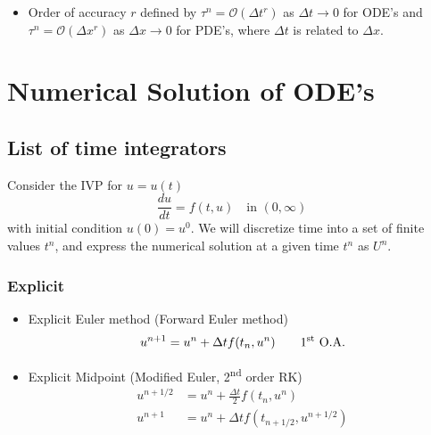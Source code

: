 \documentclass[oneside,a4paper,11pt]{report}
\begin{document}
\begin{itemize}
\item Order of accuracy $r$ defined by $\tau^n = \mathcal{O}(\Delta t^r)$ as $\Delta t \to 0$ for ODE's and $\tau^n = \mathcal{O}(\Delta x^r)$ as $\Delta x \to 0$ for PDE's, where $\Delta t$ is related to $\Delta x$.

\end{itemize}

\part{Numerical Solution of ODE's}

\chapter{List of time integrators}
Consider the IVP for $u=u(t)$
\begin{equation}
\label{ode}
\frac{du}{dt} = f(t, u) \quad \text{in } (0,\infty)
\end{equation}
with initial condition $u(0) = u^0$. We will discretize time into a set of finite values $t^n$, and express the numerical solution at a given time $t^n$ as $U^n$. 

\section{Explicit}
\begin{itemize}

\item Explicit Euler method (Forward Euler method)
\begin{equation}
u^{n+1} = u^n + \Delta t f(t_n, u^n) \qquad \text{1\textsuperscript{st} O.A.}
\end{equation}

\item Explicit Midpoint (Modified Euler, 2\textsuperscript{nd} order RK)
\begin{align}
    u^{n+1/2} &= u^n + \frac{\Delta t}{2} f(t_n, u^n) \nonumber \\
    u^{n+1}   &= u^n + \Delta t f(t_{n+1/2}, u^{n+1/2})
\end{align}

\end{itemize}
\end{document}
